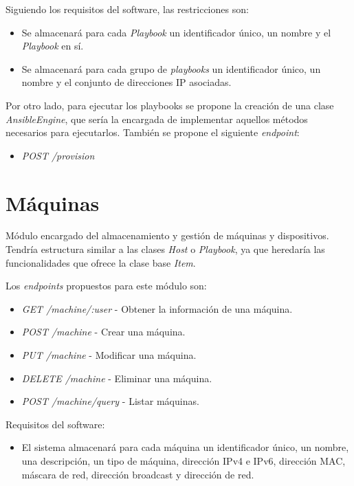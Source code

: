 \bigskip
Siguiendo los requisitos del software, las restricciones son:
\begin{itemize}
	\item Se almacenará para cada \textit{Playbook} un identificador único, un nombre y el \textit{Playbook} en sí.
	\item Se almacenará para cada grupo de \textit{playbooks} un identificador único, un nombre y el conjunto de direcciones IP asociadas.
\end{itemize}

\bigskip
Por otro lado, para ejecutar los playbooks se propone la creación de una clase \textit{AnsibleEngine}, que sería la encargada de implementar aquellos métodos necesarios para ejecutarlos. También se propone el siguiente \textit{endpoint}:
\begin{itemize}
	\item \textit{POST /provision}
\end{itemize}




\section{Máquinas}

Módulo encargado del almacenamiento y gestión de máquinas y dispositivos. Tendría estructura similar a las clases \textit{Host} o \textit{Playbook}, ya que heredaría las funcionalidades que ofrece la clase base \textit{Item}.

\bigskip
Los \textit{endpoints} propuestos para este módulo son:
\begin{itemize}
	\item \textit{GET /machine/:user} - Obtener la información de una máquina.
	\item \textit{POST /machine} - Crear una máquina.
	\item \textit{PUT /machine} - Modificar una máquina.
	\item \textit{DELETE /machine} - Eliminar una máquina.
	\item \textit{POST /machine/query} - Listar máquinas.
\end{itemize}



\bigskip
Requisitos del software:
\begin{itemize}
	\item El sistema almacenará para cada máquina un identificador único, un nombre, una descripción, un tipo de máquina, dirección IPv4 e IPv6, dirección MAC, máscara de red, dirección broadcast y dirección de red.
\end{itemize}





